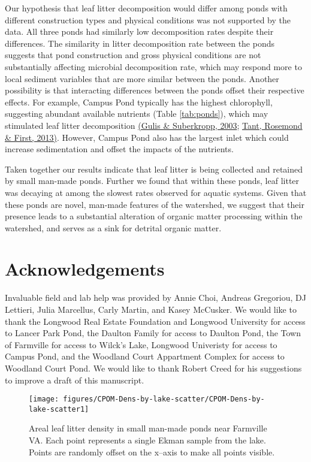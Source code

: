 \documentclass[12pt,letter]{article}
\begin{document}
Our hypothesis that leaf litter decomposition would differ among ponds with different construction types and physical conditions was not supported by the data.  All three ponds had similarly low decomposition rates despite their differences. The similarity in litter decomposition rate between the ponds suggests that pond construction and gross physical conditions are not substantially affecting microbial decomposition rate, which may respond more to local sediment variables that are more similar between the ponds. Another possibility is that interacting differences between the ponds offset their respective effects. For example, Campus Pond typically has the highest chlorophyll, suggesting abundant available nutrients (Table \ref{tab:ponds}), which may stimulated leaf litter decomposition \hyperref[csl:48]{(Gulis \& Suberkropp, 2003}; \hyperref[csl:49]{Tant, Rosemond \& First, 2013)}. However, Campus Pond also has the largest inlet which could increase sedimentation and offset the impacts of the nutrients.

Taken together our results indicate that leaf litter is being collected and retained by small man-made ponds. Further we found that within these ponds, leaf litter was decaying at among the slowest rates observed for aquatic systems. Given that these ponds are novel, man-made features of the watershed, we suggest that their presence leads to a substantial alteration of organic matter processing within the watershed, and serves as a sink for detrital organic matter.

\section{Acknowledgements}

 Invaluable field and lab help was provided by Annie Choi, Andreas Gregoriou, DJ Lettieri, Julia Marcellus, Carly Martin, and Kasey McCusker. We would like to thank the Longwood Real Estate Foundation and Longwood University for access to Lancer Park Pond, the Daulton Family for access to Daulton Pond, the Town of Farmville for access to Wilck's Lake, Longwood Univeristy for access to Campus Pond, and the Woodland Court Appartment Complex for access to Woodland Court Pond.  We would like to thank Robert Creed for his suggestions to improve a draft of this manuscript.

\begin{figure}[h!]
\begin{center}
\texttt{[image: figures/CPOM-Dens-by-lake-scatter/CPOM-Dens-by-lake-scatter1]}
\caption{{\label{fig:CPOM_density} 
Areal leaf litter density in small man-made ponds near Farmville VA. Each point represents a single Ekman sample from the lake. Points are randomly offset on the x--axis to make all points visible.%
}}
\end{center}
\end{figure}
\end{document}
